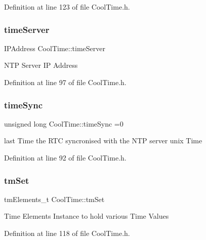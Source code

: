 Definition at line 123 of file Cool\+Time.\+h.

\mbox{\label{class_cool_time_ad2b9858f399108cb440dd1e908916f04}} 
\subsubsection{\texorpdfstring{time\+Server}{timeServer}}
{\footnotesize\ttfamily I\+P\+Address Cool\+Time\+::time\+Server\hspace{0.3cm}{\ttfamily [private]}}

N\+TP Server IP Address 

Definition at line 97 of file Cool\+Time.\+h.

\mbox{\label{class_cool_time_a9d032e76c3470a15b3bbbc52af6463f7}} 
\subsubsection{\texorpdfstring{time\+Sync}{timeSync}}
{\footnotesize\ttfamily unsigned long Cool\+Time\+::time\+Sync =0\hspace{0.3cm}{\ttfamily [private]}}

last Time the R\+TC syncronised with the N\+TP server unix Time 

Definition at line 92 of file Cool\+Time.\+h.

\mbox{\label{class_cool_time_ad33c2713c903ff064ad09c46406ae088}} 
\subsubsection{\texorpdfstring{tm\+Set}{tmSet}}
{\footnotesize\ttfamily tm\+Elements\+\_\+t Cool\+Time\+::tm\+Set\hspace{0.3cm}{\ttfamily [private]}}

Time Elements Instance to hold various Time Values 

Definition at line 118 of file Cool\+Time.\+h.

\mbox{\label{class_cool_time_a4e23216a8121ca79d0fb019f30884b92}} 
